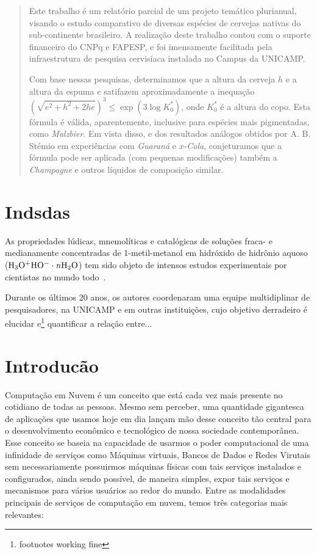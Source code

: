 \documentclass[11pt,twoside]{article}
\begin{document}
\begin{abstract} 
  Este trabalho é um relatório parcial de um projeto temático 
  plurianual, visando o estudo comparativo de diversas espécies de
  cervejas nativas do sub-continente brasileiro.  A realização deste
  trabalho contou com o suporte financeiro do CNPq e FAPESP, e foi
  imensamente facilitada pela infraestrutura de pesquisa cervisíaca
  instalada no Campus da UNICAMP.

  Com base nessas pesquisas, determinamos que a altura da cerveja $h$
  e a altura da espuma $e$ satifazem aproximadamente a inequação
  $(\sqrt{e^2 + h^2 + 2 h e})^3 \leq \exp(3 \log K_0^\ast)$, onde
  $K_0^\ast$ é a altura do copo.  Esta fórmula é válida,
  aparentemente, inclusive para espécies mais pigmentadas, como {\em
  Malzbier}.  Em vista disso, e dos resultados análogos obtidos por
  A. B. Stémio em experiências com {\em Guaraná} e $x$-{\em Cola},
  conjeturamos que a fórmula pode ser aplicada (com pequenas
  modificações) também a {\em Champagne} e outros líquidos de
  composição similar.
\end{abstract}

\section{Indsdas}

  As propriedades lúdicas, mnemolíticas e catalógicas de 
  soluções fraca- e medianamente concentradas de 1-metil-metanol
  em hidróxido de hidrônio aquoso ($\rm H_3O^{+} HO^{-}\cdot {\mathit n}H_2O$)
  tem sido objeto de intensos estudos experimentais por
  cientistas no mundo todo~\cite{AHU,KNU}.
  
  Durante os últimos 20 anos, os autores coordenaram uma equipe
  multidiplinar de pesquisadores, na UNICAMP e em outras instituições,
  cujo objetivo derradeiro é elucidar e\footnote{footnotes working fine} quantificar a relação entre...

\section{Introducão}

Computação em Nuvem é um conceito que está cada vez mais presente no cotidiano de todas as pessoas. Mesmo sem perceber, uma quantidade gigantesca de aplicações que usamos hoje 
em dia lançam mão desse conceito tão central para o desenvolvimento econômico e tecnológico de nossa sociedade contemporânea. Esse conceito se baseia na capacidade de usarmos o
poder computacional de uma infinidade de serviços como Máquinas virtuais, Bancos de Dados e Redes Virutais sem necessariamente possuirmos máquinas físicas com tais serviços 
instalados e configurados, ainda sendo possível, de maneira simples, expor tais serviços e mecanismos para vários usuários ao redor do mundo.
Entre as modalidades principais de serviços de computação em nuvem, temos três categorias mais relevantes:
\end{document}
